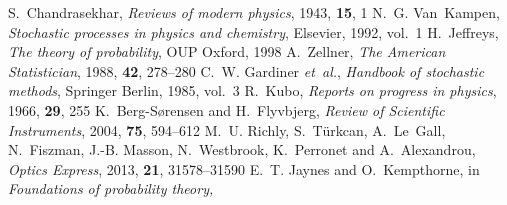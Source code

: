 \documentclass[english,aps, onecolumn, prl,superscriptaddress, notitlepage]{revtex4-1}
\begin{document}
\begin{mcitethebibliography}{17}
S.~Chandrasekhar, \emph{Reviews of modern physics}, 1943, \textbf{15}, 1\relax
\mciteBstWouldAddEndPuncttrue
\mciteSetBstMidEndSepPunct{\mcitedefaultmidpunct}
{\mcitedefaultendpunct}{\mcitedefaultseppunct}\relax
\EndOfBibitem
{}
N.~G. Van~Kampen, \emph{Stochastic processes in physics and chemistry},
  Elsevier, 1992, vol.~1\relax
\mciteBstWouldAddEndPuncttrue
\mciteSetBstMidEndSepPunct{\mcitedefaultmidpunct}
{\mcitedefaultendpunct}{\mcitedefaultseppunct}\relax
\EndOfBibitem
{}
H.~Jeffreys, \emph{The theory of probability}, OUP Oxford, 1998\relax
\mciteBstWouldAddEndPuncttrue
\mciteSetBstMidEndSepPunct{\mcitedefaultmidpunct}
{\mcitedefaultendpunct}{\mcitedefaultseppunct}\relax
\EndOfBibitem
{}
A.~Zellner, \emph{The American Statistician}, 1988, \textbf{42}, 278--280\relax
\mciteBstWouldAddEndPuncttrue
\mciteSetBstMidEndSepPunct{\mcitedefaultmidpunct}
{\mcitedefaultendpunct}{\mcitedefaultseppunct}\relax
\EndOfBibitem
{}
C.~W. Gardiner \emph{et~al.}, \emph{Handbook of stochastic methods}, Springer
  Berlin, 1985, vol.~3\relax
\mciteBstWouldAddEndPuncttrue
\mciteSetBstMidEndSepPunct{\mcitedefaultmidpunct}
{\mcitedefaultendpunct}{\mcitedefaultseppunct}\relax
\EndOfBibitem
{}
R.~Kubo, \emph{Reports on progress in physics}, 1966, \textbf{29}, 255\relax
\mciteBstWouldAddEndPuncttrue
\mciteSetBstMidEndSepPunct{\mcitedefaultmidpunct}
{\mcitedefaultendpunct}{\mcitedefaultseppunct}\relax
\EndOfBibitem
{}
K.~Berg-S{\o}rensen and H.~Flyvbjerg, \emph{Review of Scientific Instruments},
  2004, \textbf{75}, 594--612\relax
\mciteBstWouldAddEndPuncttrue
\mciteSetBstMidEndSepPunct{\mcitedefaultmidpunct}
{\mcitedefaultendpunct}{\mcitedefaultseppunct}\relax
\EndOfBibitem
{}
M.~U. Richly, S.~T{\"u}rkcan, A.~Le~Gall, N.~Fiszman, J.-B. Masson,
  N.~Westbrook, K.~Perronet and A.~Alexandrou, \emph{Optics Express}, 2013,
  \textbf{21}, 31578--31590\relax
\mciteBstWouldAddEndPuncttrue
\mciteSetBstMidEndSepPunct{\mcitedefaultmidpunct}
{\mcitedefaultendpunct}{\mcitedefaultseppunct}\relax
\EndOfBibitem
{}
E.~T. Jaynes and O.~Kempthorne, in \emph{Foundations of probability theory,
}
\end{mcitethebibliography}
\end{document}
